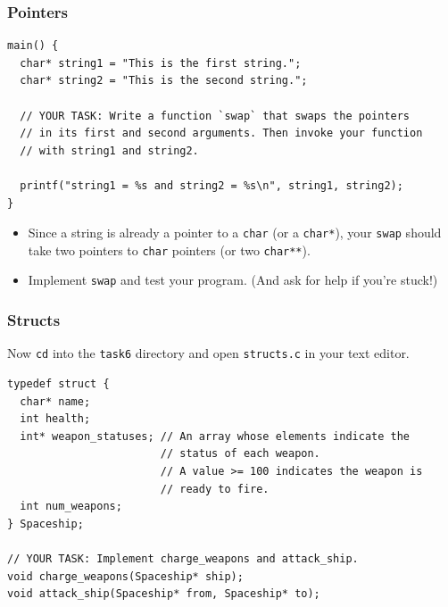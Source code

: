 \documentclass[pdf]{beamer}
\begin{document}
\begin{frame}[fragile]
  \frametitle{Pointers}

\begin{verbatim}
main() {
  char* string1 = "This is the first string.";
  char* string2 = "This is the second string.";

  // YOUR TASK: Write a function `swap` that swaps the pointers
  // in its first and second arguments. Then invoke your function
  // with string1 and string2.

  printf("string1 = %s and string2 = %s\n", string1, string2);
}
\end{verbatim}

  \begin{itemize}
  \item Since a string is already a pointer to a \texttt{char} (or a
    \texttt{char*}), your \texttt{swap} should take two pointers
    to \texttt{char} pointers (or two \texttt{char**}). \pause
  \item Implement \texttt{swap} and test your program. (And ask for help if
    you're stuck!)
  \end{itemize}

\end{frame}

\begin{frame}[fragile]
  \frametitle{Structs}

  Now \texttt{cd} into the \texttt{task6} directory and
  open \texttt{structs.c} in your text editor. \pause

\bigskip

\begin{verbatim}
typedef struct {
  char* name;
  int health;
  int* weapon_statuses; // An array whose elements indicate the
                        // status of each weapon.
                        // A value >= 100 indicates the weapon is
                        // ready to fire.
  int num_weapons;
} Spaceship;

// YOUR TASK: Implement charge_weapons and attack_ship.
void charge_weapons(Spaceship* ship);
void attack_ship(Spaceship* from, Spaceship* to);
\end{verbatim}
\end{frame}
\end{document}
